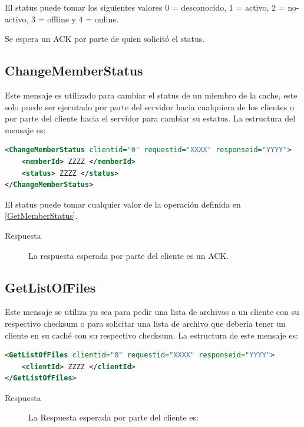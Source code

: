 El status puede tomar los siguientes valores 0 = desconocido, 1 = activo, 2 = no-activo, 3 = offline y 4 = online.

Se espera un ACK por parte de quien solicitó el status.

\subsection{ChangeMemberStatus}
Este mensaje es utilizado para cambiar el status de un miembro de la cache, este solo puede ser ejecutado por parte del servidor hacia cualquiera de los clientes o  por parte del cliente hacia el servidor para cambiar su estatus. La estructura del mensaje es:

\begin{lstlisting}[language=XML,caption=Mensaje de ChangeMemberStatus]
<ChangeMemberStatus clientid="0" requestid="XXXX" responseid="YYYY"> 
	<memberId> ZZZZ </memberId>
	<status> ZZZZ </status>
</ChangeMemberStatus>
\end{lstlisting}


El status puede tomar cualquier valor de la operación definida en \ref{GetMemberStatus}. 


\begin{description}
\item[Respuesta] La respuesta esperada por parte del cliente es un ACK.
\end{description}

\subsection{GetListOfFiles}

Este mensaje se utiliza ya sea para pedir una lista de archivos a un cliente con su respectivo checksum o para solicitar una lista de archivo que debería tener un cliente en su caché con su respectivo checksum. La estructura de este mensaje es:

\begin{lstlisting}[language=XML,caption=Mensaje de GetListOfFiles]
<GetListOfFiles clientid="0" requestid="XXXX" responseid="YYYY"> 
	<clientId> ZZZZ </clientId>
</GetListOfFiles>
\end{lstlisting}

\begin{description}
\item[Respuesta] La Respuesta esperada por parte del cliente es:
\end{description}

